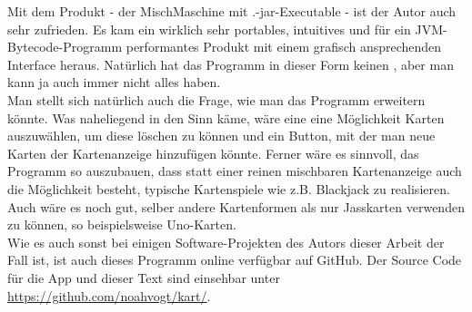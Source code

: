 \documentclass[a4paper,11pt]{article}
\begin{document}
Mit dem Produkt - der MischMaschine mit .-jar-Executable - ist der Autor auch sehr zufrieden. Es kam ein wirklich sehr portables, intuitives und für ein JVM-Bytecode-Programm performantes Produkt mit einem grafisch ansprechenden Interface heraus. Natürlich hat das Programm in dieser Form keinen , aber man kann ja auch immer nicht alles haben.\\

Man stellt sich natürlich auch die Frage, wie man das Programm erweitern könnte. Was naheliegend in den Sinn käme, wäre eine eine Möglichkeit Karten auszuwählen, um diese löschen zu können und ein Button, mit der man neue Karten der Kartenanzeige hinzufügen könnte. Ferner wäre es sinnvoll, das Programm so auszubauen, dass statt einer reinen mischbaren Kartenanzeige auch die Möglichkeit besteht, typische Kartenspiele wie z.B. Blackjack zu realisieren. Auch wäre es noch gut, selber andere Kartenformen als nur Jasskarten verwenden zu können, so beispielsweise Uno-Karten.\\

Wie es auch sonst bei einigen Software-Projekten des Autors dieser Arbeit der Fall ist, ist auch dieses Programm online verfügbar auf GitHub. Der Source Code für die App und dieser Text sind einsehbar unter \url{https://github.com/noahvogt/kart/}.
\end{document}
